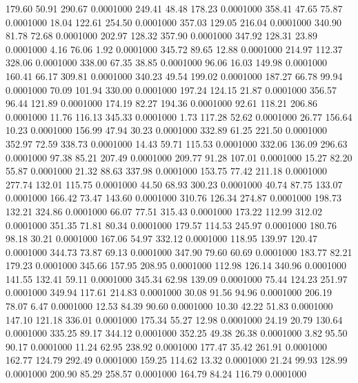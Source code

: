  179.60   50.91  290.67   0.0001000
 249.41   48.48  178.23   0.0001000
 358.41   47.65   75.87   0.0001000
  18.04  122.61  254.50   0.0001000
 357.03  129.05  216.04   0.0001000
 340.90   81.78   72.68   0.0001000
 202.97  128.32  357.90   0.0001000
 347.92  128.31   23.89   0.0001000
   4.16   76.06    1.92   0.0001000
 345.72   89.65   12.88   0.0001000
 214.97  112.37  328.06   0.0001000
 338.00   67.35   38.85   0.0001000
  96.06   16.03  149.98   0.0001000
 160.41   66.17  309.81   0.0001000
 340.23   49.54  199.02   0.0001000
 187.27   66.78   99.94   0.0001000
  70.09  101.94  330.00   0.0001000
 197.24  124.15   21.87   0.0001000
 356.57   96.44  121.89   0.0001000
 174.19   82.27  194.36   0.0001000
  92.61  118.21  206.86   0.0001000
  11.76  116.13  345.33   0.0001000
   1.73  117.28   52.62   0.0001000
  26.77  156.64   10.23   0.0001000
 156.99   47.94   30.23   0.0001000
 332.89   61.25  221.50   0.0001000
 352.97   72.59  338.73   0.0001000
  14.43   59.71  115.53   0.0001000
 332.06  136.09  296.63   0.0001000
  97.38   85.21  207.49   0.0001000
 209.77   91.28  107.01   0.0001000
  15.27   82.20   55.87   0.0001000
  21.32   88.63  337.98   0.0001000
 153.75   77.42  211.18   0.0001000
 277.74  132.01  115.75   0.0001000
  44.50   68.93  300.23   0.0001000
  40.74   87.75  133.07   0.0001000
 166.42   73.47  143.60   0.0001000
 310.76  126.34  274.87   0.0001000
 198.73  132.21  324.86   0.0001000
  66.07   77.51  315.43   0.0001000
 173.22  112.99  312.02   0.0001000
 351.35   71.81   80.34   0.0001000
 179.57  114.53  245.97   0.0001000
 180.76   98.18   30.21   0.0001000
 167.06   54.97  332.12   0.0001000
 118.95  139.97  120.47   0.0001000
 344.73   73.87   69.13   0.0001000
 347.90   79.60   60.69   0.0001000
 183.77   82.21  179.23   0.0001000
 345.66  157.95  208.95   0.0001000
 112.98  126.14  340.96   0.0001000
 141.55  132.41   59.11   0.0001000
 345.34   62.98  139.09   0.0001000
  75.44  124.23  251.97   0.0001000
 349.94  117.61  214.83   0.0001000
  30.08   91.56   94.96   0.0001000
 206.19   78.07    6.47   0.0001000
  12.53   84.39   90.60   0.0001000
  10.30   42.22   51.83   0.0001000
 147.10  121.18  336.01   0.0001000
 175.34   55.27   12.98   0.0001000
  24.19   20.79  130.64   0.0001000
 335.25   89.17  344.12   0.0001000
 352.25   49.38   26.38   0.0001000
   3.82   95.50   90.17   0.0001000
  11.24   62.95  238.92   0.0001000
 177.47   35.42  261.91   0.0001000
 162.77  124.79  292.49   0.0001000
 159.25  114.62   13.32   0.0001000
  21.24   99.93  128.99   0.0001000
 200.90   85.29  258.57   0.0001000
 164.79   84.24  116.79   0.0001000
